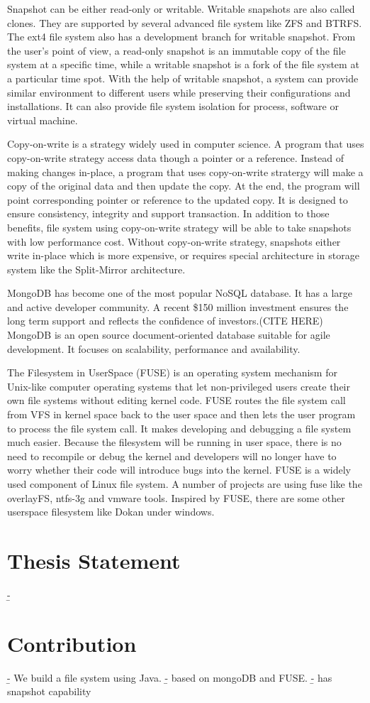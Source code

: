     Snapshot can be either read-only or writable. Writable snapshots are also called clones. They are supported by several advanced file system like ZFS and BTRFS. The ext4 file system also has a development branch for writable snapshot. From the user’s point of view, a read-only snapshot is an immutable copy of the file system at a specific time, while a writable snapshot is a fork of the file system at a particular time spot. With the help of writable snapshot, a system can provide similar environment to different users while preserving their configurations and installations. It can also provide file system isolation for process, software or virtual machine.

    Copy-on-write is a strategy widely used in computer science. A program that uses copy-on-write strategy access data though a pointer or a reference. Instead of making changes in-place, a program that uses copy-on-write stratergy will make a copy of the original data and then update the copy. At the end, the program will point corresponding pointer or reference to the updated copy. It is designed to ensure consistency, integrity and support transaction. In addition to those benefits, file system using copy-on-write strategy will be able to take snapshots with low performance cost. Without copy-on-write strategy, snapshots either write in-place which is more expensive, or requires special architecture in storage system like the Split-Mirror architecture.

    MongoDB has become one of the most popular NoSQL database. It has a large and active developer community. A recent \$150 million investment ensures the long term support and reflects the confidence of investors.(CITE HERE)\cite{rsync_alg}  MongoDB is an open source document-oriented database suitable for agile development. It focuses on scalability, performance and availability.

    The Filesystem in UserSpace (FUSE) is an operating system mechanism for Unix-like computer operating systems that let non-privileged users create their own file systems without editing kernel code. FUSE routes the file system call from VFS in kernel space back to the user space and then lets the user program to process the file system call. It makes developing and debugging a file system much easier. Because the filesystem will be running in user space, there is no need to recompile or debug the kernel and developers will no longer have to worry whether their code will introduce bugs into the kernel. FUSE is a widely used component of Linux file system. A number of projects are using fuse like the overlayFS, ntfs-3g and vmware tools. Inspired by FUSE, there are some other userspace filesystem like Dokan under windows.

\section{Thesis Statement}
   \b{-} 
\section{Contribution}
   \b{- We build a file system using Java.}
   \b{- based on mongoDB and FUSE.}
   \b{- has snapshot capability}
